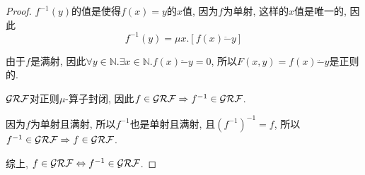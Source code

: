 \begin{proof}
    $f^{-1}(y)$的值是使得$f(x)=y$的$x$值, 因为$f$为单射, 这样的$x$值是唯一的, 因此
    $$f^{-1}(y)=\mu x.[f(x)\ddot{-}y]$$

    由于$f$是满射, 因此$\forall y\in\mathbb{N}. \exists x\in\mathbb{N}. f(x)\ddot{-}y=0$,
    所以$F(x,y)=f(x)\ddot{-}y$是正则的.

    $\mathcal{GRF}$对正则$\mu$-算子封闭, 因此$f\in\mathcal{GRF}\Rightarrow f^{-1}\in\mathcal{GRF}$.

    因为$f$为单射且满射, 所以$f^{-1}$也是单射且满射, 且$(f^{-1})^{-1}=f$, 所以$f^{-1}\in\mathcal{GRF}\Rightarrow f\in\mathcal{GRF}$.

    综上, $f\in\mathcal{GRF}\Leftrightarrow f^{-1}\in\mathcal{GRF}$.
\end{proof}